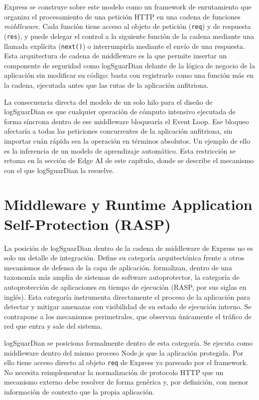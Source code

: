 Express se construye sobre este modelo como un framework de enrutamiento que organiza el procesamiento de una petición HTTP en una cadena de funciones \textit{middleware}. Cada función tiene acceso al objeto de petición (\texttt{req}) y de respuesta (\texttt{res}), y puede delegar el control a la siguiente función de la cadena mediante una llamada explícita (\texttt{next()}) o interrumpirla mediante el envío de una respuesta. Esta arquitectura de cadena de middleware es la que permite insertar un componente de seguridad como logSguarDian delante de la lógica de negocio de la aplicación sin modificar su código: basta con registrarlo como una función más en la cadena, ejecutada antes que las rutas de la aplicación anfitriona.

La consecuencia directa del modelo de un solo hilo para el diseño de logSguarDian es que cualquier operación de cómputo intensivo ejecutada de forma síncrona dentro de ese middleware bloquearía el Event Loop. Ese bloqueo afectaría a todas las peticiones concurrentes de la aplicación anfitriona, sin importar cuán rápida sea la operación en términos absolutos. Un ejemplo de ello es la inferencia de un modelo de aprendizaje automático. Esta restricción se retoma en la sección de Edge AI de este capítulo, donde se describe el mecanismo con el que logSguarDian la resuelve.

\section{Middleware y Runtime Application Self-Protection (RASP)}

La posición de logSguarDian dentro de la cadena de middleware de Express no es solo un detalle de integración. Define su categoría arquitectónica frente a otros mecanismos de defensa de la capa de aplicación. \textcite{yuan2012} formalizan, dentro de una taxonomía más amplia de sistemas de software autoprotector, la categoría de autoprotección de aplicaciones en tiempo de ejecución (RASP, por sus siglas en inglés). Esta categoría instrumenta directamente el proceso de la aplicación para detectar y mitigar amenazas con visibilidad de su estado de ejecución interno. Se contrapone a los mecanismos perimetrales, que observan únicamente el tráfico de red que entra y sale del sistema.

logSguarDian se posiciona formalmente dentro de esta categoría. Se ejecuta como middleware dentro del mismo proceso Node.js que la aplicación protegida. Por ello tiene acceso directo al objeto \texttt{req} de Express ya parseado por el framework. No necesita reimplementar la normalización de protocolo HTTP que un mecanismo externo debe resolver de forma genérica y, por definición, con menor información de contexto que la propia aplicación.

